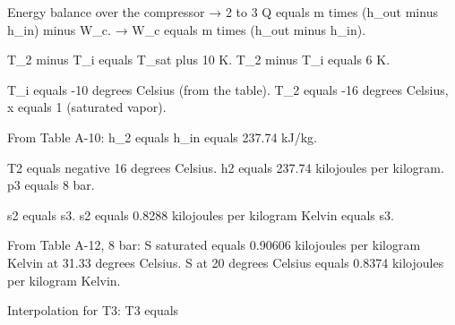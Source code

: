 Energy balance over the compressor → 2 to 3  
Q equals m times (h_out minus h_in) minus W_c.  
→ W_c equals m times (h_out minus h_in).  

T_2 minus T_i equals T_sat plus 10 K.  
T_2 minus T_i equals 6 K.  

T_i equals -10 degrees Celsius (from the table).  
T_2 equals -16 degrees Celsius, x equals 1 (saturated vapor).  

From Table A-10:  
h_2 equals h_in equals 237.74 kJ/kg.

T2 equals negative 16 degrees Celsius.  
h2 equals 237.74 kilojoules per kilogram.  
p3 equals 8 bar.  

s2 equals s3.  
s2 equals 0.8288 kilojoules per kilogram Kelvin equals s3.  

From Table A-12, 8 bar:  
S saturated equals 0.90606 kilojoules per kilogram Kelvin at 31.33 degrees Celsius.  
S at 20 degrees Celsius equals 0.8374 kilojoules per kilogram Kelvin.  

Interpolation for T3:  
T3 equals